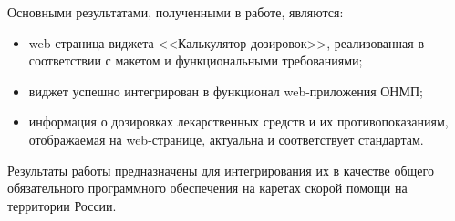 Основными результатами, полученными в работе, являются:
\begin{itemize}

\item web-страница виджета <<Калькулятор дозировок>>, реализованная в соответствии с макетом и функциональными требованиями;

\item виджет успешно интегрирован в функционал web-приложения ОНМП;

\item информация о дозировках лекарственных средств и их противопоказаниям, отображаемая на web-странице, актуальна и соответствует стандартам.
\end{itemize}

Результаты работы предназначены для интегрирования их в качестве общего обязательного программного обеспечения на каретах скорой помощи на территории России.

